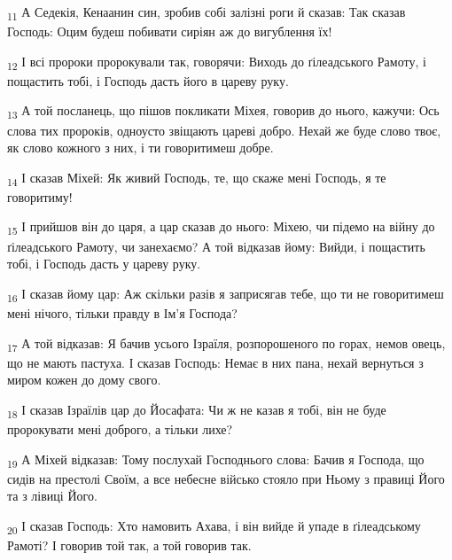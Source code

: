 \begin{tcolorbox}
\textsubscript{11} А Седекія, Кенаанин син, зробив собі залізні роги й сказав: Так сказав Господь: Оцим будеш побивати сиріян аж до вигублення їх!
\end{tcolorbox}
\begin{tcolorbox}
\textsubscript{12} І всі пророки пророкували так, говорячи: Виходь до ґілеадського Рамоту, і пощастить тобі, і Господь дасть його в цареву руку.
\end{tcolorbox}
\begin{tcolorbox}
\textsubscript{13} А той посланець, що пішов покликати Міхея, говорив до нього, кажучи: Ось слова тих пророків, одноусто звіщають цареві добро. Нехай же буде слово твоє, як слово кожного з них, і ти говоритимеш добре.
\end{tcolorbox}
\begin{tcolorbox}
\textsubscript{14} І сказав Міхей: Як живий Господь, те, що скаже мені Господь, я те говоритиму!
\end{tcolorbox}
\begin{tcolorbox}
\textsubscript{15} І прийшов він до царя, а цар сказав до нього: Міхею, чи підемо на війну до ґілеадського Рамоту, чи занехаємо? А той відказав йому: Вийди, і пощастить тобі, і Господь дасть у цареву руку.
\end{tcolorbox}
\begin{tcolorbox}
\textsubscript{16} І сказав йому цар: Аж скільки разів я заприсягав тебе, що ти не говоритимеш мені нічого, тільки правду в Ім'я Господа?
\end{tcolorbox}
\begin{tcolorbox}
\textsubscript{17} А той відказав: Я бачив усього Ізраїля, розпорошеного по горах, немов овець, що не мають пастуха. І сказав Господь: Немає в них пана, нехай вернуться з миром кожен до дому свого.
\end{tcolorbox}
\begin{tcolorbox}
\textsubscript{18} І сказав Ізраїлів цар до Йосафата: Чи ж не казав я тобі, він не буде пророкувати мені доброго, а тільки лихе?
\end{tcolorbox}
\begin{tcolorbox}
\textsubscript{19} А Міхей відказав: Тому послухай Господнього слова: Бачив я Господа, що сидів на престолі Своїм, а все небесне військо стояло при Ньому з правиці Його та з лівиці Його.
\end{tcolorbox}
\begin{tcolorbox}
\textsubscript{20} І сказав Господь: Хто намовить Ахава, і він вийде й упаде в ґілеадському Рамоті? І говорив той так, а той говорив так.
\end{tcolorbox}
